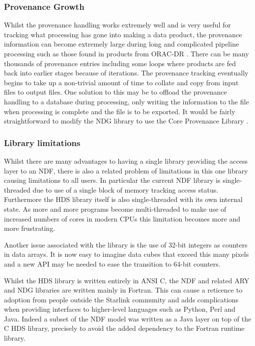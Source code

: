 \documentclass[final,authoryear,5p,times,twocolumn]{elsarticle}
\begin{document}
\subsubsection{Provenance Growth}

Whilst the provenance handling works extremely well and is very useful
for tracking what processing has gone into making a data product, the
provenance information can become extremely large during long and
complicated pipeline processing such as those found in products from
ORAC-DR \citep{2008AN....329..295C}.  There can be many thousands of
provenance entries including some loops where products are fed back
into earlier stages because of iterations.  The provenance tracking
eventually begins to take up a non-trivial amount of time to collate
and copy from input files to output files. One solution to this may be
to offload the provenance handling to a database during processing,
only writing the information to the file when processing is complete
and the file is to be exported. It would be fairly straightforward to
modify the NDG library to use the Core Provenance Library
\citep{Macko:2012:GPL:2342875.2342881}.

\subsubsection{Library limitations}

Whilst there are many advantages to having a single library
providing the access layer to an NDF, there is also a related problem
of limitations in this one library causing limitations to all
users. In particular the current NDF library is single-threaded due to
use of a single block of memory tracking access status. Furthermore
the HDS library itself is also single-threaded with its own internal
state. As more and more programs become multi-threaded to make use of
increased numbers of cores in modern CPUs this limitation becomes more
and more frustrating.

Another issue associated with the library is the use of 32-bit
integers as counters in data arrays. It is now easy to imagine data
cubes that exceed this many pixels and a new API may be needed to ease
the transition to 64-bit counters.

Whilst the HDS library is written entirely in ANSI C, the NDF and
related ARY \citep{SUN11} and NDG \citep{SUN2} libraries are written
mainly in Fortran.
This can cause a reticence to adoption from people outside the Starlink community and
adds complications when providing interfaces to higher-level languages
such as Python, Perl and Java. Indeed a subset of the NDF model  was
written as a Java layer on top of the C HDS library, precisely to
avoid the added dependency to the Fortran runtime library.
\end{document}
